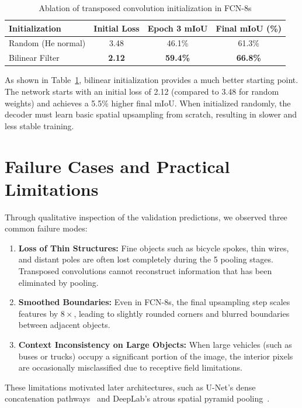 \documentclass[conference]{IEEEtran}
\begin{document}
\begin{table}[htbp]
\caption{Ablation of transposed convolution initialization in FCN-8s}
\label{tab:ablation_init}
\centering
\begin{tabular}{lccc}
\toprule
\textbf{Initialization} & \textbf{Initial Loss} & \textbf{Epoch 3 mIoU} & \textbf{Final mIoU (\%)} \\
\midrule
Random (He normal)     & 3.48 & 46.1\% & 61.3\% \\
Bilinear Filter        & \textbf{2.12} & \textbf{59.4\%} & \textbf{66.8\%} \\
\bottomrule
\end{tabular}
\end{table}

As shown in Table~\ref{tab:ablation_init}, bilinear initialization provides a much better starting point. The network starts with an initial loss of 2.12 (compared to 3.48 for random weights) and achieves a 5.5\% higher final mIoU. When initialized randomly, the decoder must learn basic spatial upsampling from scratch, resulting in slower and less stable training.

\section{Failure Cases and Practical Limitations}
Through qualitative inspection of the validation predictions, we observed three common failure modes:
\begin{enumerate}
    \item \textbf{Loss of Thin Structures:} Fine objects such as bicycle spokes, thin wires, and distant poles are often lost completely during the 5 pooling stages. Transposed convolutions cannot reconstruct information that has been eliminated by pooling.
    \item \textbf{Smoothed Boundaries:} Even in FCN-8s, the final upsampling step scales features by $8\times$, leading to slightly rounded corners and blurred boundaries between adjacent objects.
    \item \textbf{Context Inconsistency on Large Objects:} When large vehicles (such as buses or trucks) occupy a significant portion of the image, the interior pixels are occasionally misclassified due to receptive field limitations.
\end{enumerate}

These limitations motivated later architectures, such as U-Net's dense concatenation pathways~\cite{ronneberger2015u} and DeepLab's atrous spatial pyramid pooling~\cite{chen2017rethinking}.
\end{document}
